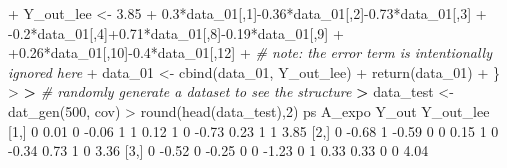 \documentclass[
]{article}
\newenvironment{Shaded}{\begin{snugshade}}{\end{snugshade}}
\newcommand{\CommentTok}[1]{\textcolor[rgb]{0.56,0.35,0.01}{\textit{#1}}}
\newcommand{\DecValTok}[1]{\textcolor[rgb]{0.00,0.00,0.81}{#1}}
\newcommand{\ErrorTok}[1]{\textcolor[rgb]{0.64,0.00,0.00}{\textbf{#1}}}
\newcommand{\FloatTok}[1]{\textcolor[rgb]{0.00,0.00,0.81}{#1}}
\newcommand{\FunctionTok}[1]{\textcolor[rgb]{0.00,0.00,0.00}{#1}}
\newcommand{\NormalTok}[1]{#1}
\newcommand{\OtherTok}[1]{\textcolor[rgb]{0.56,0.35,0.01}{#1}}
\newcommand{\SpecialCharTok}[1]{\textcolor[rgb]{0.00,0.00,0.00}{#1}}
\begin{document}
\begin{Shaded}
\begin{Highlighting}[]
\SpecialCharTok{+}\NormalTok{   Y\_out\_lee }\OtherTok{\textless{}{-}} \FloatTok{3.85} \SpecialCharTok{+} \FloatTok{0.3}\SpecialCharTok{*}\NormalTok{data\_01[,}\DecValTok{1}\NormalTok{]}\SpecialCharTok{{-}}\FloatTok{0.36}\SpecialCharTok{*}\NormalTok{data\_01[,}\DecValTok{2}\NormalTok{]}\SpecialCharTok{{-}}\FloatTok{0.73}\SpecialCharTok{*}\NormalTok{data\_01[,}\DecValTok{3}\NormalTok{]}
\SpecialCharTok{+}                         \SpecialCharTok{{-}}\FloatTok{0.2}\SpecialCharTok{*}\NormalTok{data\_01[,}\DecValTok{4}\NormalTok{]}\SpecialCharTok{+}\FloatTok{0.71}\SpecialCharTok{*}\NormalTok{data\_01[,}\DecValTok{8}\NormalTok{]}\SpecialCharTok{{-}}\FloatTok{0.19}\SpecialCharTok{*}\NormalTok{data\_01[,}\DecValTok{9}\NormalTok{]}
\SpecialCharTok{+}                         \SpecialCharTok{+}\FloatTok{0.26}\SpecialCharTok{*}\NormalTok{data\_01[,}\DecValTok{10}\NormalTok{]}\SpecialCharTok{{-}}\FloatTok{0.4}\SpecialCharTok{*}\NormalTok{data\_01[,}\DecValTok{12}\NormalTok{]}
\SpecialCharTok{+}   \CommentTok{\# note: the error term is intentionally ignored here}
\SpecialCharTok{+}\NormalTok{   data\_01 }\OtherTok{\textless{}{-}} \FunctionTok{cbind}\NormalTok{(data\_01, Y\_out\_lee)}
\SpecialCharTok{+}   \FunctionTok{return}\NormalTok{(data\_01)}
\SpecialCharTok{+}\NormalTok{ \}}
\SpecialCharTok{\textgreater{}} 
\ErrorTok{\textgreater{}} \CommentTok{\# randomly generate a dataset to see the structure}
\ErrorTok{\textgreater{}}\NormalTok{ data\_test }\OtherTok{\textless{}{-}} \FunctionTok{dat\_gen}\NormalTok{(}\DecValTok{500}\NormalTok{, cov)}
\SpecialCharTok{\textgreater{}} \FunctionTok{round}\NormalTok{(}\FunctionTok{head}\NormalTok{(data\_test),}\DecValTok{2}\NormalTok{)}
\NormalTok{                                           ps A\_expo Y\_out Y\_out\_lee}
\NormalTok{[}\DecValTok{1}\NormalTok{,] }\DecValTok{0}  \FloatTok{0.01} \DecValTok{0} \SpecialCharTok{{-}}\FloatTok{0.06} \DecValTok{1} \DecValTok{1}  \FloatTok{0.12} \DecValTok{1} \DecValTok{0} \SpecialCharTok{{-}}\FloatTok{0.73} \FloatTok{0.23}      \DecValTok{1}     \DecValTok{1}      \FloatTok{3.85}
\NormalTok{[}\DecValTok{2}\NormalTok{,] }\DecValTok{0} \SpecialCharTok{{-}}\FloatTok{0.68} \DecValTok{1} \SpecialCharTok{{-}}\FloatTok{0.59} \DecValTok{0} \DecValTok{0}  \FloatTok{0.15} \DecValTok{1} \DecValTok{0} \SpecialCharTok{{-}}\FloatTok{0.34} \FloatTok{0.73}      \DecValTok{1}     \DecValTok{0}      \FloatTok{3.36}
\NormalTok{[}\DecValTok{3}\NormalTok{,] }\DecValTok{0} \SpecialCharTok{{-}}\FloatTok{0.52} \DecValTok{0} \SpecialCharTok{{-}}\FloatTok{0.25} \DecValTok{0} \DecValTok{0} \SpecialCharTok{{-}}\FloatTok{1.23} \DecValTok{0} \DecValTok{1}  \FloatTok{0.33} \FloatTok{0.33}      \DecValTok{0}     \DecValTok{0}      \FloatTok{4.04}

\end{Highlighting}
\end{Shaded}
\end{document}
